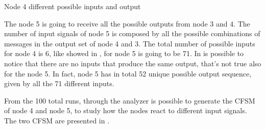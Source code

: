 \begin{table}[h]
	
	\caption{Node 4 different possible inputs and output}
	\label{tbl:fig_4_node4_possible_inputs}
\end{table}

The node \num{5} is going to receive all the possible outputs from node \num{3} and
\num{4}.
The number of input signals of node \num{5} is composed by all the possible
combinations of messages in the output set of node \num{4} and \num{3}.
The total number of possible inputs for node \num{4} is \num{6}, like
showed in , for node \num{5} is going
to be \num{71}.
In  is possible to notice that
there are no inputs that produce the same output, that's not true also for
the node \num{5}.
In fact, node \num{5} has in total \num{52} unique possible output sequence,
given by all the \num{71} different inputs.

From the \num{100} total runs, through the analyzer is possible to generate
the \ac{CFSM} of node \num{4} and node \num{5}, to study how the nodes react
to different input signals.
The two \ac{CFSM} are presented in .

